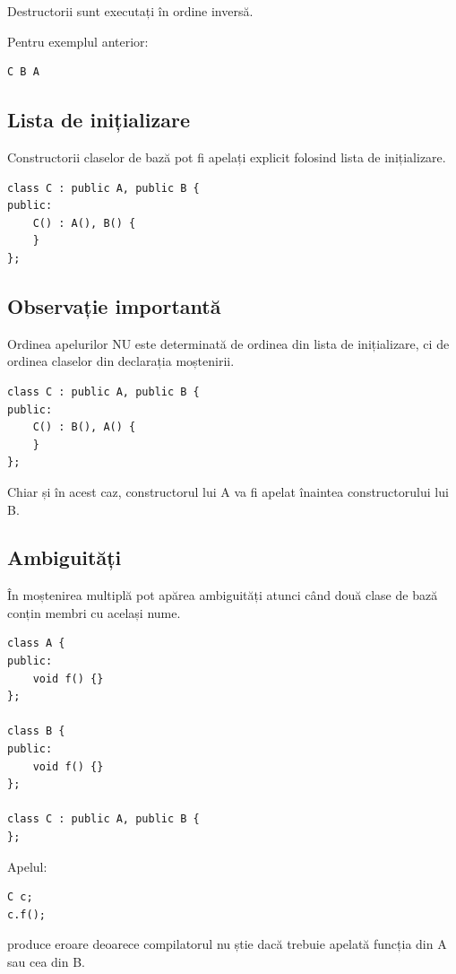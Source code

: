 \documentclass[12pt,a4paper]{article}
\begin{document}
Destructorii sunt executați în ordine inversă.

Pentru exemplul anterior:

\begin{verbatim}
C B A
\end{verbatim}

\subsection{Lista de inițializare}

Constructorii claselor de bază pot fi apelați explicit folosind lista de inițializare.

\begin{verbatim}
class C : public A, public B {
public:
    C() : A(), B() {
    }
};
\end{verbatim}

\subsection{Observație importantă}

Ordinea apelurilor NU este determinată de ordinea din lista de inițializare, ci de ordinea claselor din declarația moștenirii.

\begin{verbatim}
class C : public A, public B {
public:
    C() : B(), A() {
    }
};
\end{verbatim}

Chiar și în acest caz, constructorul lui A va fi apelat înaintea constructorului lui B.

\subsection{Ambiguități}

În moștenirea multiplă pot apărea ambiguități atunci când două clase de bază conțin membri cu același nume.

\begin{verbatim}
class A {
public:
    void f() {}
};

class B {
public:
    void f() {}
};

class C : public A, public B {
};
\end{verbatim}

Apelul:

\begin{verbatim}
C c;
c.f();
\end{verbatim}

produce eroare deoarece compilatorul nu știe dacă trebuie apelată funcția din A sau cea din B.
\end{document}
